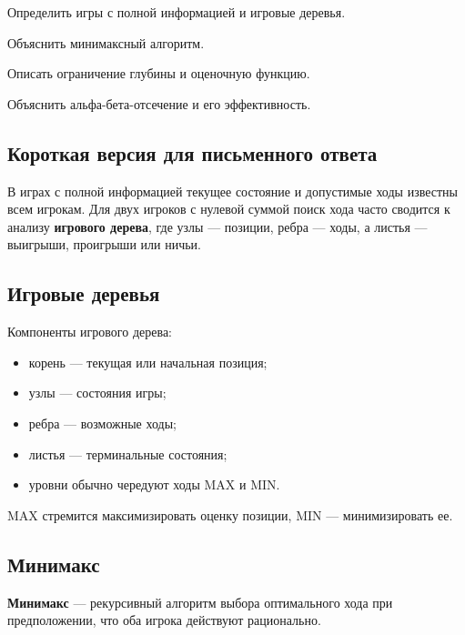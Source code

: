 
\begin{examplan}
    \item Определить игры с полной информацией и игровые деревья.
    \item Объяснить минимаксный алгоритм.
    \item Описать ограничение глубины и оценочную функцию.
    \item Объяснить альфа-бета-отсечение и его эффективность.
\end{examplan}

\subsection*{Короткая версия для письменного ответа}

В играх с полной информацией текущее состояние и допустимые ходы известны всем игрокам. Для двух игроков с нулевой суммой поиск хода часто сводится к анализу \textbf{игрового дерева}, где узлы --- позиции, ребра --- ходы, а листья --- выигрыши, проигрыши или ничьи.

\subsection*{Игровые деревья}

Компоненты игрового дерева:
\begin{itemize}
    \item корень --- текущая или начальная позиция;
    \item узлы --- состояния игры;
    \item ребра --- возможные ходы;
    \item листья --- терминальные состояния;
    \item уровни обычно чередуют ходы MAX и MIN.
\end{itemize}

MAX стремится максимизировать оценку позиции, MIN --- минимизировать ее.

\subsection*{Минимакс}

\textbf{Минимакс} --- рекурсивный алгоритм выбора оптимального хода при предположении, что оба игрока действуют рационально.


